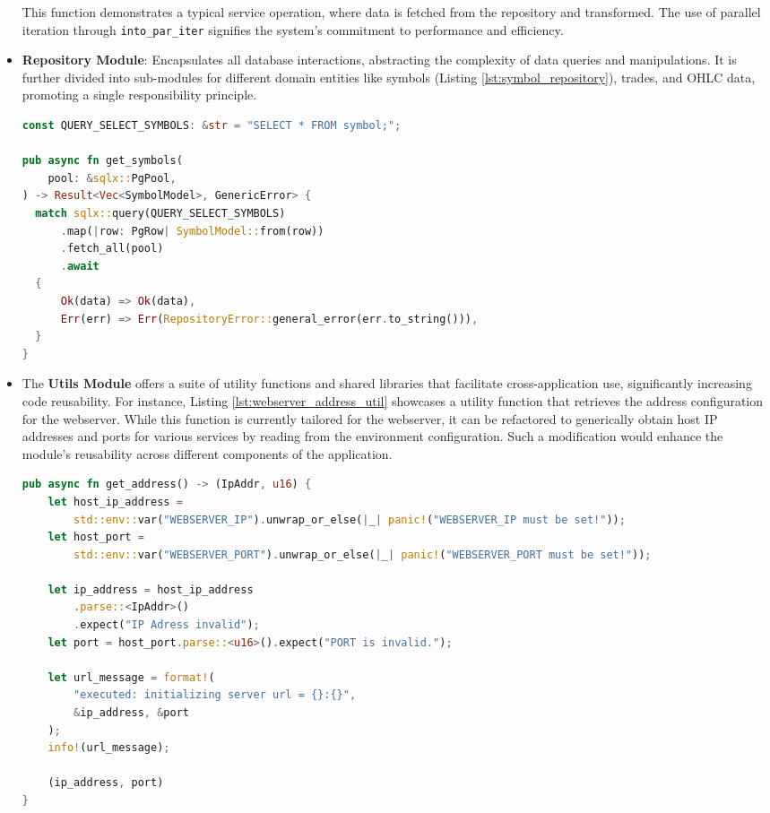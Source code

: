 \begin{itemize}
This function demonstrates a typical service operation, where data is fetched from the repository and transformed. The use of parallel iteration through \texttt{into\_par\_iter} signifies the system's commitment to performance and efficiency.

\item \textbf{Repository Module}: Encapsulates all database interactions, abstracting the complexity of data queries and manipulations. It is further divided into sub-modules for different domain entities like symbols (Listing \ref{lst:symbol_repository}), trades, and OHLC data, promoting a single responsibility principle.
\begin{lstlisting}[language=rust, caption={Symbol Repository Example}, label=lst:symbol_repository]
const QUERY_SELECT_SYMBOLS: &str = "SELECT * FROM symbol;";

pub async fn get_symbols(
    pool: &sqlx::PgPool,
) -> Result<Vec<SymbolModel>, GenericError> {
  match sqlx::query(QUERY_SELECT_SYMBOLS)
      .map(|row: PgRow| SymbolModel::from(row))
      .fetch_all(pool)
      .await
  {
      Ok(data) => Ok(data),
      Err(err) => Err(RepositoryError::general_error(err.to_string())),
  }
}
\end{lstlisting}

\item The \textbf{Utils Module} offers a suite of utility functions and shared libraries that facilitate cross-application use, significantly increasing code reusability. For instance, Listing \ref{lst:webserver_address_util} showcases a utility function that retrieves the address configuration for the webserver. While this function is currently tailored for the webserver, it can be refactored to generically obtain host IP addresses and ports for various services by reading from the environment configuration. Such a modification would enhance the module's reusability across different components of the application.
\begin{lstlisting}[language=rust, caption={Util get\_address for Webserver}, label=lst:webserver_address_util]
pub async fn get_address() -> (IpAddr, u16) {
    let host_ip_address =
        std::env::var("WEBSERVER_IP").unwrap_or_else(|_| panic!("WEBSERVER_IP must be set!"));
    let host_port =
        std::env::var("WEBSERVER_PORT").unwrap_or_else(|_| panic!("WEBSERVER_PORT must be set!"));

    let ip_address = host_ip_address
        .parse::<IpAddr>()
        .expect("IP Adress invalid");
    let port = host_port.parse::<u16>().expect("PORT is invalid.");

    let url_message = format!(
        "executed: initializing server url = {}:{}",
        &ip_address, &port
    );
    info!(url_message);

    (ip_address, port)
}
\end{lstlisting}


\end{itemize}

